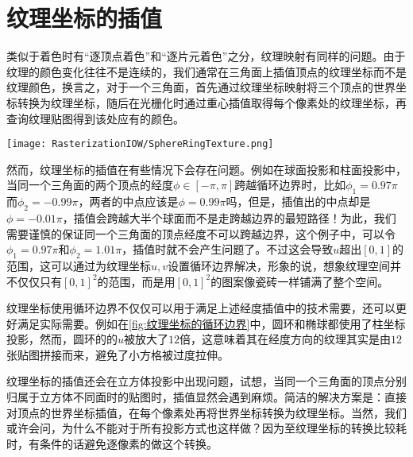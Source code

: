 \section{纹理坐标的插值}

类似于着色时有“逐顶点着色”和“逐片元着色”之分，纹理映射有同样的问题。由于纹理的颜色变化往往不是连续的，我们通常在三角面上插值顶点的纹理坐标而不是纹理颜色，换言之，对于一个三角面，首先通过纹理坐标映射将三个顶点的世界坐标转换为纹理坐标，随后在光栅化时通过重心插值取得每个像素处的纹理坐标，再查询纹理贴图得到该处应有的颜色。
\begin{Figure}[纹理坐标的循环边界]
    \texttt{[image: RasterizationIOW/SphereRingTexture.png]}
\end{Figure}

然而，纹理坐标的插值在有些情况下会存在问题。例如在球面投影和柱面投影中，当同一个三角面的两个顶点的经度$\phi\in[-\pi,\pi]$跨越循环边界时，比如$\phi_1=0.97\pi$而$\phi_2=-0.99\pi$，两者的中点应该是$\phi=0.99\pi$吗，但是，插值出的中点却是$\phi=-0.01\pi$，插值会跨越大半个球面而不是走跨越边界的最短路径！为此，我们需要谨慎的保证同一个三角面的顶点经度不可以跨越边界，这个例子中，可以令$\phi_1=0.97\pi$和$\phi_2=1.01\pi$，插值时就不会产生问题了。不过这会导致$u$超出$[0,1]$的范围，这可以通过为纹理坐标$u,v$设置循环边界解决，形象的说，想象纹理空间并不仅仅只有$[0,1]^2$的范围，而是用$[0,1]^2$的图案像瓷砖一样铺满了整个空间。

纹理坐标使用循环边界不仅仅可以用于满足上述经度插值中的技术需要，还可以更好满足实际需要。例如在\cref{fig:纹理坐标的循环边界}中，圆环和椭球都使用了柱坐标投影，然而，圆环的的$u$被放大了$12$倍，这意味着其在经度方向的纹理其实是由$12$张贴图拼接而来，避免了小方格被过度拉伸。

纹理坐标的插值还会在立方体投影中出现问题，试想，当同一个三角面的顶点分别归属于立方体不同面时的贴图时，插值显然会遇到麻烦。简洁的解决方案是：直接对顶点的世界坐标插值，在每个像素处再将世界坐标转换为纹理坐标。当然，我们或许会问，为什么不能对于所有投影方式也这样做？因为至纹理坐标的转换比较耗时，有条件的话避免逐像素的做这个转换。